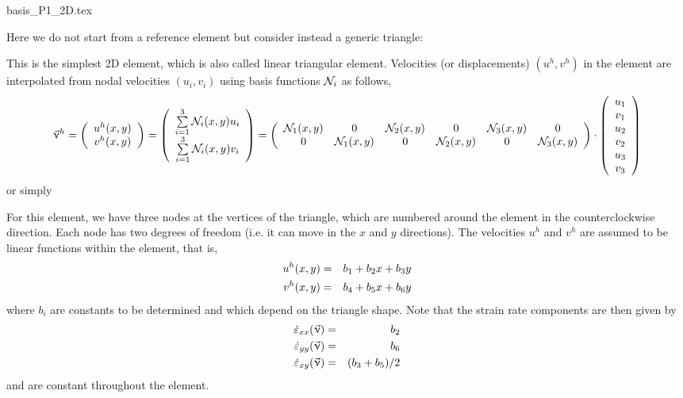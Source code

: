 \begin{flushright} {\tiny {\color{gray} basis\_P1\_2D.tex}} \end{flushright}

Here we do not start from a reference element but consider instead a generic triangle:



This is the simplest 2D element, which is also called linear triangular element.
Velocities (or displacements) $(u^h,v^h)$ in the element are interpolated from nodal velocities
$(u_i,v_i)$ using basis functions ${\mathcal{N}}_i$ as follows,
\[
\vec\upnu^h=
\left(
\begin{array}{c}
u^h(x,y) \\v^h(x,y)
\end{array}
\right)
=
\left(
\begin{array}{c}
\sum\limits_{i=1}^3 {\mathcal{N}}_i(x,y) u_i \\
\sum\limits_{i=1}^3 {\mathcal{N}}_i(x,y) v_i
\end{array}
\right)
=
\left(
\begin{array}{cccccc}
{\mathcal{N}}_1(x,y) & 0 & {\mathcal{N}}_2(x,y) & 0 & {\mathcal{N}}_3(x,y) & 0\\
0 & {\mathcal{N}}_1(x,y) & 0 & {\mathcal{N}}_2(x,y) & 0 & {\mathcal{N}}_3(x,y)\\
\end{array}
\right)
\cdot
\left(
\begin{array}{c}
u_1 \\ v_1 \\ u_2 \\ v_2 \\ u_3 \\ v_3
\end{array}
\right)
\]
or simply 

For this element, we have three nodes at the vertices of the triangle, which are 
numbered around the element in the counterclockwise direction. 
Each node has two degrees of freedom (i.e. it can move in the $x$ and $y$ directions). 
The velocities $u^h$ and $v^h$ are assumed to be linear functions within the element, that is, 
\begin{eqnarray}
u^h(x,y)&=&b_1 +b_2x+b_3y \nonumber\\
v^h(x,y)&=&b_4 +b_5x+b_6y
\end{eqnarray}
where $b_i$ are constants to be determined and which depend on the triangle shape.
Note that the strain rate components are then given by
\begin{eqnarray}
\dot\varepsilon_{xx}(\vec\upnu)&=&b_2  \nonumber\\
\dot\varepsilon_{yy}(\vec\upnu)&=&b_6  \nonumber\\
\dot\varepsilon_{xy}(\vec\upnu)&=&(b_3+b_5)/2 \nonumber
\end{eqnarray}
and are constant throughout the element.

